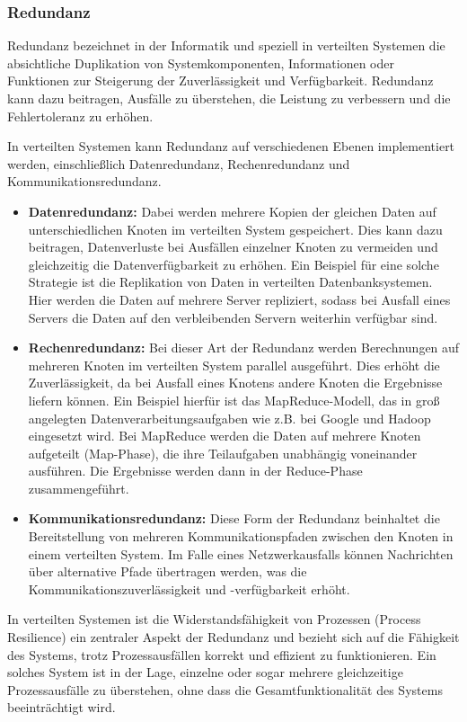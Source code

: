 \documentclass[../vs-script-first-v01.tex]{subfiles}
\begin{document}
\subsubsection{Redundanz}
Redundanz bezeichnet in der Informatik und speziell in verteilten Systemen die absichtliche Duplikation von Systemkomponenten, Informationen oder Funktionen zur Steigerung der Zuverlässigkeit und Verfügbarkeit. Redundanz kann dazu beitragen, Ausfälle zu überstehen, die Leistung zu verbessern und die Fehlertoleranz zu erhöhen.

In verteilten Systemen kann Redundanz auf verschiedenen Ebenen implementiert werden, einschließlich Datenredundanz, Rechenredundanz und Kommunikationsredundanz.
\begin{itemize}
\item \textbf{Datenredundanz:} Dabei werden mehrere Kopien der gleichen Daten auf unterschiedlichen Knoten im verteilten System gespeichert. Dies kann dazu beitragen, Datenverluste bei Ausfällen einzelner Knoten zu vermeiden und gleichzeitig die Datenverfügbarkeit zu erhöhen. Ein Beispiel für eine solche Strategie ist die Replikation von Daten in verteilten Datenbanksystemen. Hier werden die Daten auf mehrere Server repliziert, sodass bei Ausfall eines Servers die Daten auf den verbleibenden Servern weiterhin verfügbar sind.
\item \textbf{Rechenredundanz:} Bei dieser Art der Redundanz werden Berechnungen auf mehreren Knoten im verteilten System parallel ausgeführt. Dies erhöht die Zuverlässigkeit, da bei Ausfall eines Knotens andere Knoten die Ergebnisse liefern können. Ein Beispiel hierfür ist das MapReduce-Modell, das in groß angelegten Datenverarbeitungsaufgaben wie z.B. bei Google und Hadoop eingesetzt wird. Bei MapReduce werden die Daten auf mehrere Knoten aufgeteilt (Map-Phase), die ihre Teilaufgaben unabhängig voneinander ausführen. Die Ergebnisse werden dann in der Reduce-Phase zusammengeführt.
\item \textbf{Kommunikationsredundanz:} Diese Form der Redundanz beinhaltet die Bereitstellung von mehreren Kommunikationspfaden zwischen den Knoten in einem verteilten System. Im Falle eines Netzwerkausfalls können Nachrichten über alternative Pfade übertragen werden, was die Kommunikationszuverlässigkeit und -verfügbarkeit erhöht.
\end{itemize}
In verteilten Systemen ist die Widerstandsfähigkeit von Prozessen (Process Resilience) ein zentraler Aspekt der Redundanz und bezieht sich auf die Fähigkeit des Systems, trotz Prozessausfällen korrekt und effizient zu funktionieren. Ein solches System ist in der Lage, einzelne oder sogar mehrere gleichzeitige Prozessausfälle zu überstehen, ohne dass die Gesamtfunktionalität des Systems beeinträchtigt wird.
\end{document}
